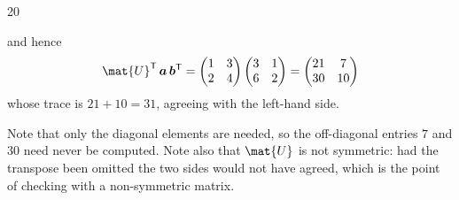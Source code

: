 \documentclass{sotonExamBoxes}    %
\begin{document}
\begin{question}{20}
\begin{qparts}
{\begin{answer}
        and hence
        \begin{align*}
          \mat{U}^\tr\, \bm{a}\, \bm{b}^\tr =
          \begin{pmatrix} 1 & 3 \\ 2 & 4 \end{pmatrix}
          \begin{pmatrix} 3 & 1 \\ 6 & 2 \end{pmatrix}
          = \begin{pmatrix} 21 & 7 \\ 30 & 10 \end{pmatrix}
        \end{align*}
        whose trace is $21 + 10 = 31$, agreeing with the left-hand side.

        Note that only the diagonal elements are needed, so the
        off-diagonal entries $7$ and $30$ need never be computed.  Note
        also that $\mat{U}$ is not symmetric: had the transpose been
        omitted the two sides would not have agreed, which is the point
        of checking with a non-symmetric matrix.
      \end{answer}}{}



\end{qparts}
\end{question}
\end{document}
